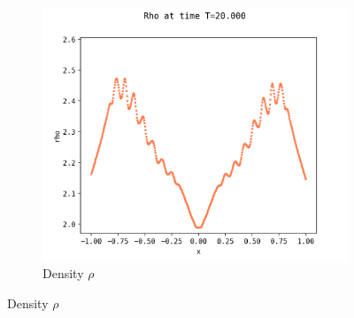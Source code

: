 \documentclass{article}
\numberwithin{equation}{section}
\newcommand{\imh}{\textheight} %
\newcommand{\imw}{\textwidth} %
\begin{document}
\begin{figure}
\begin{subfigure}{\textwidth}
		\includegraphics[height=\imh,width=\imw]{images/rhoT20_512_3.png}
		\caption{Density $\rho$}
		\label{subfig:compT02_rho}
	\end{subfigure}
	

\end{figure}
\end{document}
